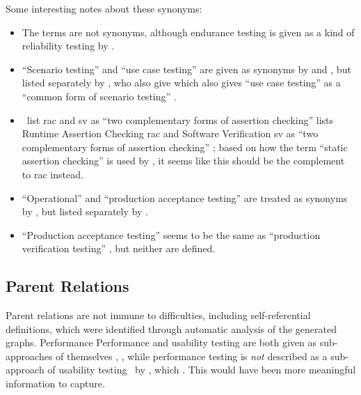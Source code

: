 \ifnotpaper
      Some interesting notes about these synonyms:
      \begin{itemize}
            \item The terms are not synonyms, although endurance testing is given
                  as a kind of reliability testing by \citet[p.~55]{Firesmith2015}.
            \item ``Scenario testing'' and ``use case testing'' are given as synonyms
                  by \citetISTQB{} and \citet[pp.~47-49]{Kam2008}, but listed
                  separately by \citet[p.~22]{IEEE2022},
                  \ifnotpaper who also give \else which also gives \fi ``use case
                  testing'' as a ``common form of scenario testing''
                  \citeyearpar[p.~20]{IEEE2021}.
            \item \ifnotpaper
                        \citeauthor{ChalinEtAl2006}~list \acf{rac} and \acf{sv} as ``two
                        complementary forms of assertion checking''
                        \citeyearpar[p.~343]{ChalinEtAl2006}%
                  \else
                        \cite[p.~343]{ChalinEtAl2006} lists Runtime Assertion
                        Checking \acf{rac} and Software Verification \acf{sv} as
                        ``two complementary forms of assertion checking''%
                  \fi; based on how the term ``static
                  assertion checking'' is used by \citet[p.~345]{LahiriEtAl2013}, it
                  seems like this should be the complement to \acs{rac} instead.
            \item ``Operational'' and ``production acceptance testing'' are treated
                  as synonyms by \citetISTQB{}, but listed separately by
                  \citet[p.~30]{Firesmith2015}.
            \item ``Production acceptance testing'' \citep[p.~30]{Firesmith2015}
                  seems to be the same as ``production verification testing''
                  \citep[p.~22]{IEEE2022}, but neither are defined.
      \end{itemize}
\fi

\subsection{Parent Relations}
\label{par-rels}

Parent relations are not immune to difficulties, including self-referential
definitions, which were identified through automatic analysis of the generated
graphs. \ifnotpaper  Performance
\else Performance and usability testing are both given as sub-approaches of
      themselves \cite[Tab.~1]{Gerrard2000b}, \cite[Tab.~2]{Gerrard2000a},
      while performance \fi
testing is \emph{not} described as a sub-approach of usability testing%
\ifnotpaper\ by \citep{Gerrard2000a, Gerrard2000b}, which \else. This
\fi would have been more meaningful information to capture.

